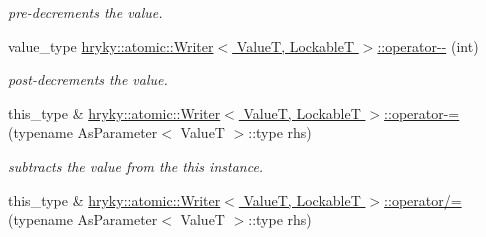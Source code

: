 \begin{DoxyCompactItemize}
\begin{DoxyCompactList}\small\item\em pre-\/decrements the value. \end{DoxyCompactList}\item 
\hypertarget{group__atomic__operation_ga034cdbf5814223426e50001330c6dddd}{value\-\_\-type \hyperlink{group__atomic__operation_ga034cdbf5814223426e50001330c6dddd}{hryky\-::atomic\-::\-Writer$<$ Value\-T, Lockable\-T $>$\-::operator-\/-\/} (int)}\label{group__atomic__operation_ga034cdbf5814223426e50001330c6dddd}

\begin{DoxyCompactList}\small\item\em post-\/decrements the value. \end{DoxyCompactList}\item 
\hypertarget{group__atomic__operation_gace0bc7c5e8b6db7afe82e231697672a0}{this\-\_\-type \& \hyperlink{group__atomic__operation_gace0bc7c5e8b6db7afe82e231697672a0}{hryky\-::atomic\-::\-Writer$<$ Value\-T, Lockable\-T $>$\-::operator-\/=} (typename As\-Parameter$<$ Value\-T $>$\-::type rhs)}\label{group__atomic__operation_gace0bc7c5e8b6db7afe82e231697672a0}

\begin{DoxyCompactList}\small\item\em subtracts the value from the this instance. \end{DoxyCompactList}\item 
\hypertarget{group__atomic__operation_ga1f4841e2995310212eb4762cd3717e6b}{this\-\_\-type \& \hyperlink{group__atomic__operation_ga1f4841e2995310212eb4762cd3717e6b}{hryky\-::atomic\-::\-Writer$<$ Value\-T, Lockable\-T $>$\-::operator/=} (typename As\-Parameter$<$ Value\-T $>$\-::type rhs)}\label{group__atomic__operation_ga1f4841e2995310212eb4762cd3717e6b}


\end{DoxyCompactItemize}
